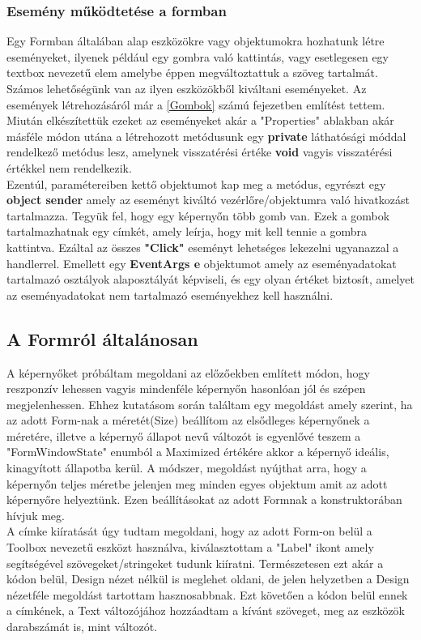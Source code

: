 \documentclass[tocnopagenum]{thesis-ekf}
\theoremstyle{definition}
\theoremstyle{remark}
\begin{document}
	\subsubsection{Esemény működtetése a formban}
	\label{esemenyformban}
	Egy Formban általában alap eszközökre vagy objektumokra hozhatunk létre eseményeket, ilyenek például egy gombra való kattintás, vagy esetlegesen egy textbox nevezetű elem amelybe éppen megváltoztattuk a szöveg tartalmát.
	Számos lehetőségünk van az ilyen eszközökből kiváltani eseményeket.
	Az események létrehozásáról már a \ref{Gombok} számú fejezetben említést tettem.
	Miután elkészítettük ezeket az eseményeket akár a "Properties" ablakban akár másféle módon utána a létrehozott metódusunk egy \textbf{private} láthatósági móddal rendelkező metódus lesz, amelynek visszatérési értéke \textbf{void} vagyis visszatérési értékkel nem rendelkezik. 
	\\
	Ezentúl, paramétereiben kettő objektumot kap meg a metódus, egyrészt egy \textbf{object sender} amely az eseményt kiváltó vezérlőre/objektumra való hivatkozást tartalmazza. Tegyük fel, hogy egy képernyőn több gomb van. Ezek a gombok tartalmazhatnak egy címkét, amely leírja, hogy mit kell tennie a gombra kattintva. Ezáltal az összes \textbf{"Click"} eseményt lehetséges lekezelni ugyanazzal a handlerrel.
	Emellett egy \textbf{EventArgs e} objektumot amely az eseményadatokat tartalmazó osztályok alaposztályát képviseli, és egy olyan értéket biztosít, amelyet az eseményadatokat nem tartalmazó eseményekhez kell használni. 
	\cite{eventobjargs}
	
	\subsection{A Formról általánosan}
	A képernyőket próbáltam megoldani az előzőekben említett módon, hogy reszponzív lehessen vagyis mindenféle képernyőn hasonlóan jól és szépen megjelenhessen. Ehhez kutatásom során találtam egy megoldást amely szerint, ha az adott Form-nak a méretét(Size) beállítom az elsődleges képernyőnek a méretére, illetve a képernyő állapot nevű változót is egyenlővé teszem a "FormWindowState" enumból a Maximized értékére akkor a képernyő ideális, kinagyított állapotba kerül. A módszer, megoldást nyújthat arra, hogy a képernyőn teljes méretbe jelenjen meg minden egyes objektum amit az adott képernyőre helyeztünk. Ezen beállításokat az adott Formnak a konstruktorában hívjuk meg.
	\\
	A címke kiíratását úgy tudtam megoldani, hogy az adott Form-on belül a Toolbox nevezetű eszközt használva, kiválasztottam a "Label" ikont amely segítségével szövegeket/stringeket tudunk kiíratni. Természetesen ezt akár a kódon belül, Design nézet nélkül is meglehet oldani, de jelen helyzetben a Design nézetféle megoldást tartottam hasznosabbnak. Ezt követően a kódon belül ennek a címkének, a Text változójához hozzáadtam a kívánt szöveget, meg az eszközök darabszámát is, mint változót.
\end{document}
